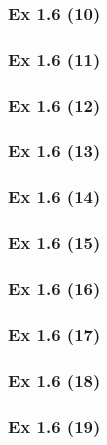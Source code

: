 \subsubsection{Ex 1.6 (10)}\label{sec:Ex_1.6.10}

\newpage		%

\subsubsection{Ex 1.6 (11)}\label{sec:Ex_1.6.11}

\subsubsection{Ex 1.6 (12)}\label{sec:Ex_1.6.12}

\subsubsection{Ex 1.6 (13)}\label{sec:Ex_1.6.13}

\subsubsection{Ex 1.6 (14)}\label{sec:Ex_1.6.14}

\subsubsection{Ex 1.6 (15)}\label{sec:Ex_1.6.15}

\subsubsection{Ex 1.6 (16)}\label{sec:Ex_1.6.16}

\subsubsection{Ex 1.6 (17)}\label{sec:Ex_1.6.17}

\subsubsection{Ex 1.6 (18)}\label{sec:Ex_1.6.18}

\subsubsection{Ex 1.6 (19)}\label{sec:Ex_1.6.19}


